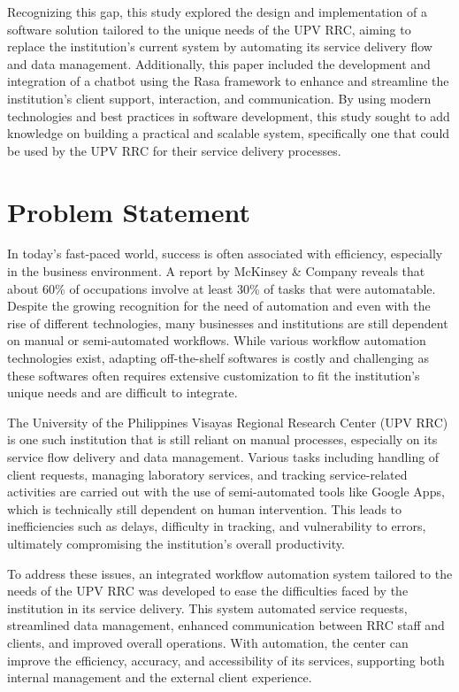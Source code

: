 Recognizing this gap, this study explored the design and implementation of a software solution tailored to the unique needs of the UPV RRC, aiming to replace the institution’s current system by automating its service delivery flow and data management. Additionally, this paper included the development and integration of a chatbot using the Rasa framework to enhance and streamline the institution’s client support, interaction, and communication. By using modern technologies and best practices in software development, this study sought to add knowledge on building a practical and scalable system, specifically one that could be used by the UPV RRC for their service delivery processes.

\section{Problem Statement}

In today’s fast-paced world, success is often associated with efficiency, especially in the business environment. A report by McKinsey \& Company \cite{manyika2017} reveals that about 60\% of occupations involve at least 30\% of tasks that were automatable. Despite the growing recognition for the need of automation and even with the rise of different technologies, many businesses and institutions are still dependent on manual or semi-automated workflows. While various workflow automation technologies exist, adapting off-the-shelf softwares is costly and challenging as these softwares often requires extensive customization to fit the institution’s unique needs and are difficult to integrate. 

The University of the Philippines Visayas Regional Research Center (UPV RRC) is one such institution that is still reliant on manual processes, especially on its service flow delivery and data management. Various tasks including handling of client requests, managing laboratory services, and tracking service-related activities are carried out with the use of semi-automated tools like Google Apps, which is technically still dependent on human intervention. This leads to inefficiencies such as delays, difficulty in tracking, and vulnerability to errors, ultimately compromising the institution’s overall productivity.

To address these issues, an integrated workflow automation system tailored to the needs of the UPV RRC was developed to ease the difficulties faced by the institution in its service delivery. This system automated service requests, streamlined data management, enhanced communication between RRC staff and clients, and improved overall operations. With automation, the center can improve the efficiency, accuracy, and accessibility of its services, supporting both internal management and the external client experience.

